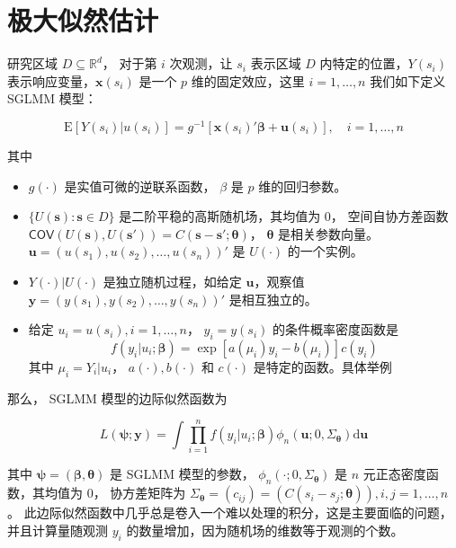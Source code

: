 \documentclass[12pt,a4paper,UTF8,twoside]{book}
\providecommand{\tightlist}{%
  \setlength{\itemsep}{0pt}\setlength{\parskip}{0pt}}
\theoremstyle{definition}
\theoremstyle{definition}
\theoremstyle{definition}
\theoremstyle{remark}
\begin{document}
\hypertarget{mle}{%
\section{极大似然估计}\label{mle}}

研究区域 \(D \subseteq \mathbb{R}^d\)， 对于第 \(i\) 次观测，让 \(s_i\)
表示区域 \(D\) 内特定的位置，\(Y(s_i)\)
表示响应变量，\(\mathbf{x}(s_i)\) 是一个 \(p\) 维的固定效应，这里
\(i = 1, \ldots, n\) 我们如下定义 SGLMM 模型：

\[
\mathrm{E}[Y(s_i)|u(s_i)] = g^{-1}[\mathbf{x}(s_i)'\boldsymbol{\beta} + \mathbf{u}(s_i)], \quad i = 1,\ldots,n
\]

\noindent 其中

\begin{itemize}
\tightlist
\item
  \(g(\cdot)\) 是实值可微的逆联系函数， \(\beta\) 是 \(p\)
  维的回归参数。
\item
  \(\{U(\mathbf{s}): \mathbf{s} \in D\}\)
  是二阶平稳的高斯随机场，其均值为 0， 空间自协方差函数
  \(\mathsf{COV}(U(\mathbf{s}),U(\mathbf{s}')) = C(\mathbf{s} - \mathbf{s}'; \boldsymbol{\theta})\)，
  \(\boldsymbol{\theta}\) 是相关参数向量。
  \(\mathbf{u} = (u(s_1),u(s_2),\ldots,u(s_n))'\) 是 \(U(\cdot)\)
  的一个实例。
\item
  \(Y(\cdot)|U(\cdot)\) 是独立随机过程，如给定 \(\mathbf{u}\)，观察值
  \(\mathbf{y} = (y(s_1),y(s_2),\ldots,y(s_n))'\) 是相互独立的。
\item
  给定 \(u_i = u(s_i), i = 1, \ldots, n\)， \(y_i = y(s_i)\)
  的条件概率密度函数是
  \[f(y_i|u_i;\boldsymbol{\beta}) = \exp[a(\mu_i)y_i - b(\mu_i)]c(y_i)\]
  其中 \(\mu_i = Y_i|u_i\)， \(a(\cdot),b(\cdot)\) 和 \(c(\cdot)\)
  是特定的函数。具体举例 \citep{McCullagh1989}
\end{itemize}

\noindent 那么， SGLMM 模型的边际似然函数为

\begin{equation}
L(\boldsymbol{\psi};\mathbf{y}) = \int \prod_{i=1}^{n} f(y_i|u_i;\boldsymbol{\beta})\phi_{n}(\mathbf{u};0,\Sigma_{\boldsymbol{\theta}})\mathrm{d}\mathbf{u} \label{eq:likelihood-function-1}
\end{equation}

\noindent 其中
\(\boldsymbol{\psi} = (\boldsymbol{\beta},\boldsymbol{\theta})\) 是
SGLMM 模型的参数， \(\phi_{n}(\cdot;0,\Sigma_{\boldsymbol{\theta}})\) 是
\(n\) 元正态密度函数，其均值为 0， 协方差矩阵为
\(\Sigma_{\boldsymbol{\theta}} = (c_{ij}) = (C(s_i - s_j; \boldsymbol{\theta})), i,j = 1,\ldots,n\)。
此边际似然函数中几乎总是卷入一个难以处理的积分，这是主要面临的问题，并且计算量随观测
\(y_i\) 的数量增加，因为随机场的维数等于观测的个数。
\end{document}
